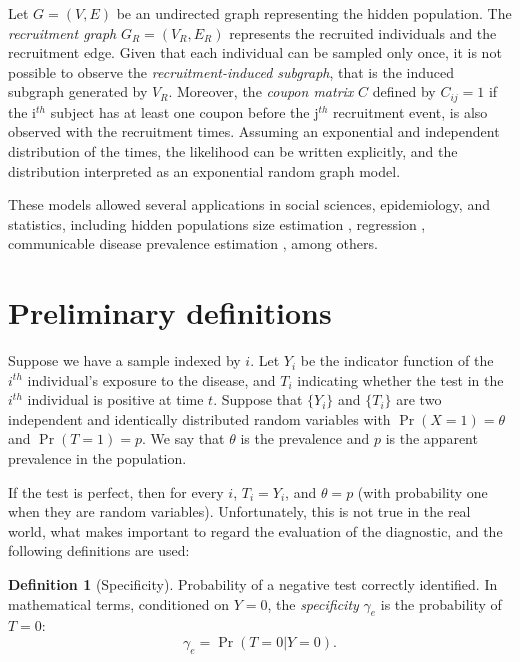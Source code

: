 \documentclass[a4paper, notitlepage, 11pt]{article}
\theoremstyle{definition}
\newtheorem{definition}{Definition}[section]
\theoremstyle{remark}
\begin{document}
Let $G = (V,E)$ be an undirected graph representing the hidden population. The {\em recruitment graph} $G_R =
(V_R, E_R)$ represents the recruited individuals and the recruitment edge.
Given that each individual can be sampled only once, it is not possible to
observe the {\em recruitment-induced subgraph}, that is the induced subgraph
generated by $V_R$. Moreover, the {\em coupon matrix} $C$ defined by $C_{ij} =
1$ if the i$^{th}$ subject has at least one coupon before the j$^{th}$
recruitment event, is also observed with the recruitment times. Assuming an
exponential and independent distribution of the times, the likelihood can be
written explicitly, and the distribution interpreted as an exponential random graph
model. 

These models allowed several applications in social sciences, epidemiology,
and statistics, including hidden populations size estimation
\cite{crawford2018hidden}, regression \cite{bastos2012binary}, communicable
disease prevalence estimation \cite{albuquerque2009avaliaccao}, among others.

\section{Preliminary definitions}

Suppose we have a sample indexed by $i$. Let $Y_i$ be the indicator
function of the $i^{th}$ individual's exposure to the disease, and $T_i$
indicating whether the test in the $i^{th}$ individual is positive at time
$t$. Suppose that $\{Y_i\}$ and $\{T_i\}$ are two independent and identically distributed
random variables with $\Pr(X = 1) = \theta$ and $\Pr(T = 1) = p$. We say that
$\theta$ is the prevalence and $p$ is the apparent prevalence in the
population. 

If the test is perfect, then for every $i$, $T_i = Y_i$, and
$\theta = p$ (with probability one when they are random variables).
Unfortunately, this is not true in the real world, what makes important to
regard the evaluation of the diagnostic, and the following definitions are used:

\begin{definition}[Specificity]
  Probability of a negative test correctly identified. In mathematical terms,
  conditioned on $Y = 0$, the {\em specificity} $\gamma_e$ is the probability of $T = 0$: 
  \begin{equation}
    \gamma_e = \Pr(T = 0|Y = 0). 
  \end{equation} 
\end{definition}
\end{document}
